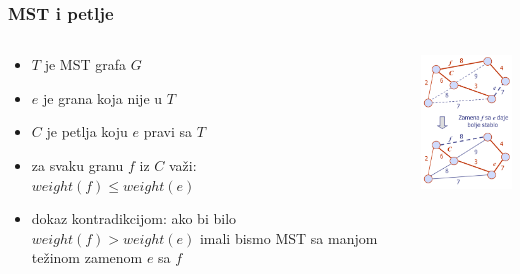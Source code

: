 \documentclass[compress]{beamer}
\begin{document}
\begin{frame}[fragile]
  \frametitle{MST i petlje}
  \begin{columns}
    \begin{column}[t]{7cm}
      \begin{itemize}
        \item $T$ je MST grafa $G$
        \item $e$ je grana koja nije u $T$
        \item $C$ je petlja koju $e$ pravi sa $T$
        \item za svaku granu $f$ iz $C$ važi: \\ $weight(f)\leq weight(e)$
        \item dokaz kontradikcijom: ako bi bilo $weight(f)>weight(e)$
          imali bismo MST sa manjom težinom zamenom $e$ sa $f$
      \end{itemize}
    \end{column}
    \begin{column}[t]{5cm}
      \begin{center}
        \includegraphics[width=4.5cm]{asp-14-pic70.png}
      \end{center}
    \end{column}
  \end{columns}
\end{frame}
\end{document}
